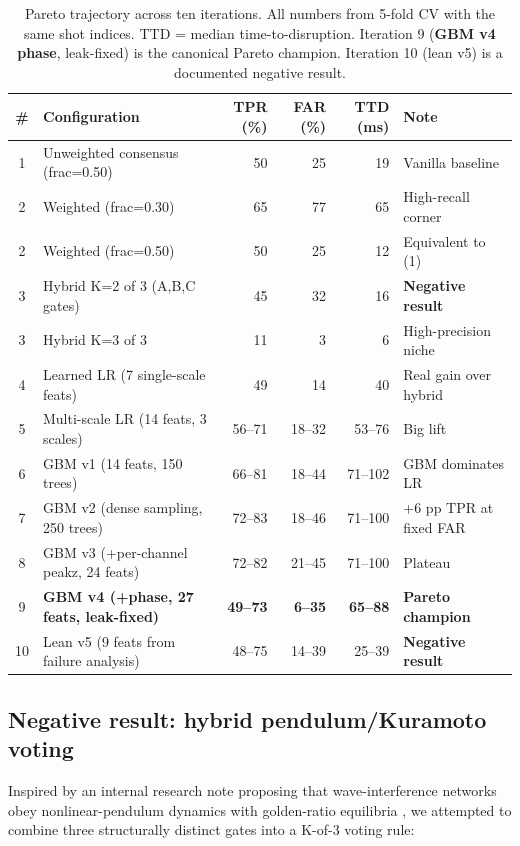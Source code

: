 \documentclass[11pt,letterpaper]{article}
\begin{document}
\begin{table}[h]
\centering
\caption{Pareto trajectory across ten iterations. All numbers from 5-fold
CV with the same shot indices. TTD = median time-to-disruption.
Iteration 9 (\textbf{GBM v4 phase}, leak-fixed) is the canonical Pareto
champion. Iteration 10 (lean v5) is a documented negative result.}
\label{tab:trajectory}
\begin{tabular}{c l rrr l}
\toprule
\# & Configuration & TPR (\%) & FAR (\%) & TTD (ms) & Note \\
\midrule
1 & Unweighted consensus (frac=0.50) & 50 & 25 & 19 & Vanilla baseline \\
2 & Weighted (frac=0.30) & 65 & 77 & 65 & High-recall corner \\
2 & Weighted (frac=0.50) & 50 & 25 & 12 & Equivalent to (1) \\
3 & Hybrid K=2 of 3 (A,B,C gates) & 45 & 32 & 16 & \textbf{Negative result} \\
3 & Hybrid K=3 of 3 & 11 & 3 & 6 & High-precision niche \\
4 & Learned LR (7 single-scale feats) & 49 & 14 & 40 & Real gain over hybrid \\
5 & Multi-scale LR (14 feats, 3 scales) & 56--71 & 18--32 & 53--76 & Big lift \\
6 & GBM v1 (14 feats, 150 trees) & 66--81 & 18--44 & 71--102 & GBM dominates LR \\
7 & GBM v2 (dense sampling, 250 trees) & 72--83 & 18--46 & 71--100 & +6 pp TPR at fixed FAR \\
8 & GBM v3 (+per-channel peakz, 24 feats) & 72--82 & 21--45 & 71--100 & Plateau \\
9 & \textbf{GBM v4 (+phase, 27 feats, leak-fixed)} & \textbf{49--73} & \textbf{6--35} & \textbf{65--88} & \textbf{Pareto champion} \\
10 & Lean v5 (9 feats from failure analysis) & 48--75 & 14--39 & 25--39 & \textbf{Negative result} \\
\bottomrule
\end{tabular}
\end{table}

\subsection{Negative result: hybrid pendulum/Kuramoto voting}\label{ssec:hybrid}

Inspired by an internal research note proposing that wave-interference
networks obey nonlinear-pendulum dynamics with golden-ratio equilibria
\cite{knopp_golden_pendulum}, we attempted to combine three structurally
distinct gates into a K-of-3 voting rule:
\end{document}

